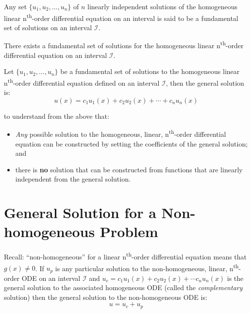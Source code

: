 \begin{definition}
Any set $\{u_1,u_2,\dots,u_n\}$ of $n$ linearly independent solutions of the homogeneous linear n\textsuperscript{th}-order differential equation on an interval is said to be a fundamental set of solutions on an interval $\mathcal{I}$.  
\end{definition}
\begin{theorem}
There exists a fundamental set of solutions for the homogeneous linear n\textsuperscript{th}-order differential equation on an interval $\mathcal{I}$.
\end{theorem}

\begin{definition}
Let $\{u_1,u_2,\dots,u_n\}$ be a fundamental set of solutions to the homogeneous linear n\textsuperscript{th}-order differential equation defined on an interval $\mathcal{I}$, then the general solution is:
$$u(x) = c_1u_1(x)+c_2u_2(x)+\cdots+c_nu_n(x)$$
\end{definition}

 to understand from the above that:
\begin{itemize}
\item \emph{Any} possible solution to the homogeneous, linear, n\textsuperscript{th}-order differential equation can be constructed by setting the coefficients of the general solution; and
\item there is \textbf{no} solution that can be constructed from functions that are linearly independent from the general solution.
\end{itemize}

\section{General Solution for a Non-homogeneous Problem}
Recall: ``non-homogeneous'' for a linear n\textsuperscript{th}-order differential equation means that $g(x)\ne 0$.  If $u_p$ is any particular solution to the non-homogeneous, linear, n\textsuperscript{th}-order ODE on an interval $\mathcal{I}$ and $u_c = c_1u_1(x) + c_2u_2(x)+\cdots c_nu_n(x)$ is the general solution to the associated homogeneous ODE (called the \emph{complementary} solution) then the general solution to the non-homogeneous ODE is:
\begin{equation*}
u = u_c + u_p
\end{equation*}


